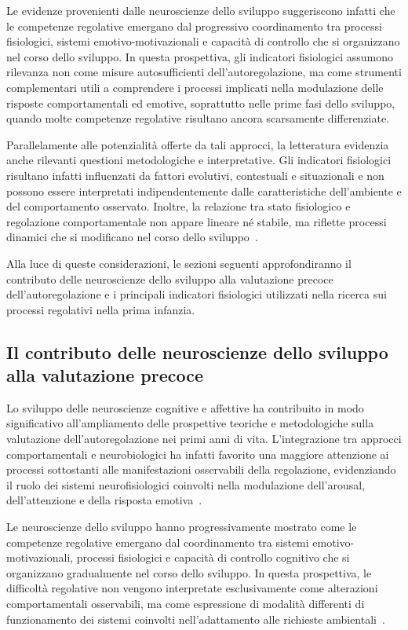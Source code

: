         Le evidenze provenienti dalle neuroscienze dello sviluppo suggeriscono infatti che le competenze regolative emergano dal progressivo coordinamento tra processi fisiologici, sistemi emotivo-motivazionali e capacità di controllo che si organizzano nel corso dello sviluppo. In questa prospettiva, gli indicatori fisiologici assumono rilevanza non come misure autosufficienti dell'autoregolazione, ma come strumenti complementari utili a comprendere i processi implicati nella modulazione delle risposte comportamentali ed emotive, soprattutto nelle prime fasi dello sviluppo, quando molte competenze regolative risultano ancora scarsamente differenziate.

        Parallelamente alle potenzialità offerte da tali approcci, la letteratura evidenzia anche rilevanti questioni metodologiche e interpretative. Gli indicatori fisiologici risultano infatti influenzati da fattori evolutivi, contestuali e situazionali e non possono essere interpretati indipendentemente dalle caratteristiche dell'ambiente e del comportamento osservato. Inoltre, la relazione tra stato fisiologico e regolazione comportamentale non appare lineare né stabile, ma riflette processi dinamici che si modificano nel corso dello sviluppo~\cite{cole2004,calkins2007hill}.

        Alla luce di queste considerazioni, le sezioni seguenti approfondiranno il contributo delle neuroscienze dello sviluppo alla valutazione precoce dell'autoregolazione e i principali indicatori fisiologici utilizzati nella ricerca sui processi regolativi nella prima infanzia.

        \subsection{Il contributo delle neuroscienze dello sviluppo alla valutazione precoce}
        \label{sec:3_3_1}

            Lo sviluppo delle neuroscienze cognitive e affettive ha contribuito in modo significativo all'ampliamento delle prospettive teoriche e metodologiche sulla valutazione dell'autoregolazione nei primi anni di vita. L'integrazione tra approcci comportamentali e neurobiologici ha infatti favorito una maggiore attenzione ai processi sottostanti alle manifestazioni osservabili della regolazione, evidenziando il ruolo dei sistemi neurofisiologici coinvolti nella modulazione dell'arousal, dell'attenzione e della risposta emotiva~\cite{blair2015,blair2022}.

            Le neuroscienze dello sviluppo hanno progressivamente mostrato come le competenze regolative emergano dal coordinamento tra sistemi emotivo-motivazionali, processi fisiologici e capacità di controllo cognitivo che si organizzano gradualmente nel corso dello sviluppo. In questa prospettiva, le difficoltà regolative non vengono interpretate esclusivamente come alterazioni comportamentali osservabili, ma come espressione di modalità differenti di funzionamento dei sistemi coinvolti nell'adattamento alle richieste ambientali~\cite{beauchaine2019}.

